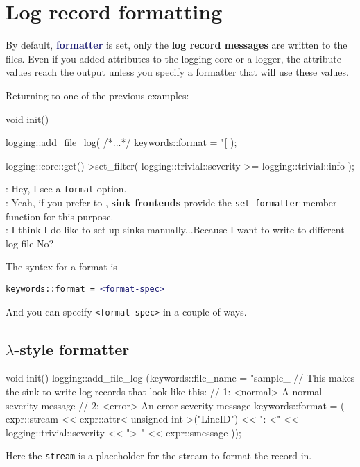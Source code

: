 \documentclass[dvipsnames]{article}
\newcommand{\mycola}{MidnightBlue}
\newcommand{\cola}[1]{\textcolor{\mycola}{#1}}
\newcommand{\Cola}[1]{\textcolor{\mycola}{\textbf{#1}}}
\let\emph\relax %
\begin{document}
\section{Log record formatting}
By default, \Cola{formatter} is set, only the \textbf{log record messages} are
written to the files. Even if you added attributes to the logging core or a
logger, the attribute values \emph{will not} reach the output unless you specify
a formatter that will use these values.

Returning to one of the previous examples:

\begin{simplec}
  void init(){
    logging::add_file_log(
    /*...*/
    keywords::format = "[%
    );

    logging::core::get()->set_filter(
    logging::trivial::severity >= logging::trivial::info
    );
  }
\end{simplec}

\begin{tcolorbox}
   : Hey, I see a \texttt{format} option.\\
   : Yeah, if you prefer to \emph{set up sinks manually},
  \textbf{sink frontends} provide the \texttt{set\_formatter} member function
  for this purpose. \\
   : I think I do like to set up sinks manually...Because I want
  to write to different log file No?
\end{tcolorbox}

The syntex for a format is
\begin{center}
  \texttt{keywords::format = \cola{<format-spec>}}
\end{center}
And you can specify \texttt{<format-spec>} in a couple of ways.
\subsection{$\lambda$-style formatter}
\begin{simplec}
  void init() {
    logging::add_file_log (keywords::file_name = "sample_%
    // This makes the sink to write log records that look like this:
    // 1: <normal> A normal severity message
    // 2: <error> An error severity message
    keywords::format = (
    expr::stream << expr::attr< unsigned int >("LineID") << ": <" << logging::trivial::severity
    << "> " << expr::smessage
    ));
  }
\end{simplec}
Here the \texttt{stream} is a placeholder for the stream to format the record
in.
\end{document}

